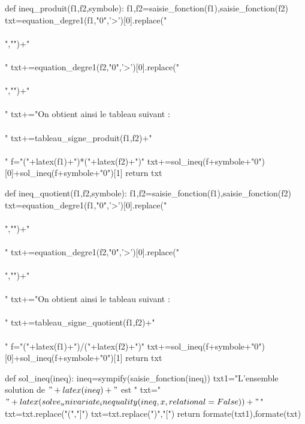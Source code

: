\begin{pycode}
def ineq_produit(f1,f2,symbole):
    f1,f2=saisie_fonction(f1),saisie_fonction(f2)
    txt=equation_degre1(f1,"0",'>')[0].replace("\\\\","")+"\\\\"
    txt+=equation_degre1(f2,"0",'>')[0].replace("\\\\","")+"\\\\"
    txt+="On obtient ainsi le tableau suivant : \\\\"
    txt+=tableau_signe_produit(f1,f2)+"\\\\"
    f="("+latex(f1)+")*("+latex(f2)+")"
    txt+=sol_ineq(f+symbole+"0")[0]+sol_ineq(f+symbole+"0")[1]
    return txt

def ineq_quotient(f1,f2,symbole):
    f1,f2=saisie_fonction(f1),saisie_fonction(f2)
    txt=equation_degre1(f1,"0",'>')[0].replace("\\\\","")+"\\\\"
    txt+=equation_degre1(f2,"0",'>')[0].replace("\\\\","")+"\\\\"
    txt+="On obtient ainsi le tableau suivant : \\\\"
    txt+=tableau_signe_quotient(f1,f2)+"\\\\"
    f="("+latex(f1)+")/("+latex(f2)+")"
    txt+=sol_ineq(f+symbole+"0")[0]+sol_ineq(f+symbole+"0")[1]
    return txt

def sol_ineq(ineq):
    ineq=sympify(saisie_fonction(ineq))
    txt1="L'ensemble solution de $"+latex(ineq)+"$ est "
    txt="$"+latex(solve_univariate_inequality(ineq,x,relational=False))+"$"
    txt=txt.replace("(","]")
    txt=txt.replace(")","[")
    return formate(txt1),formate(txt)


	    

	
\end{pycode}